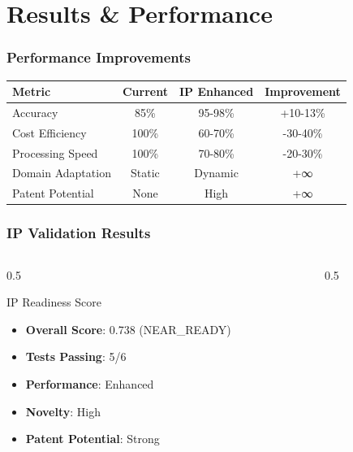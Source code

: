 \documentclass{beamer}
\begin{document}
\section{Results \& Performance}

\begin{frame}
\frametitle{Performance Improvements}
\begin{table}[h]
\centering
\begin{tabular}{@{}lccc@{}}
\toprule
\textbf{Metric} & \textbf{Current} & \textbf{IP Enhanced} & \textbf{Improvement} \\
\midrule
Accuracy & 85\% & 95-98\% & +10-13\% \\
Cost Efficiency & 100\% & 60-70\% & -30-40\% \\
Processing Speed & 100\% & 70-80\% & -20-30\% \\
Domain Adaptation & Static & Dynamic & +∞ \\
Patent Potential & None & High & +∞ \\
\bottomrule
\end{tabular}
\end{table}
\end{frame}

\begin{frame}
\frametitle{IP Validation Results}
\begin{columns}
\begin{column}{0.5\textwidth}
\begin{block}{IP Readiness Score}
\begin{itemize}
\item \textbf{Overall Score}: 0.738 (NEAR\_READY)
\item \textbf{Tests Passing}: 5/6
\item \textbf{Performance}: Enhanced
\item \textbf{Novelty}: High
\item \textbf{Patent Potential}: Strong
\end{itemize}
\end{block}
\end{column}
\begin{column}{0.5\textwidth}
\begin{center}
\end{center}
\end{column}
\end{columns}
\end{frame}
\end{document}
